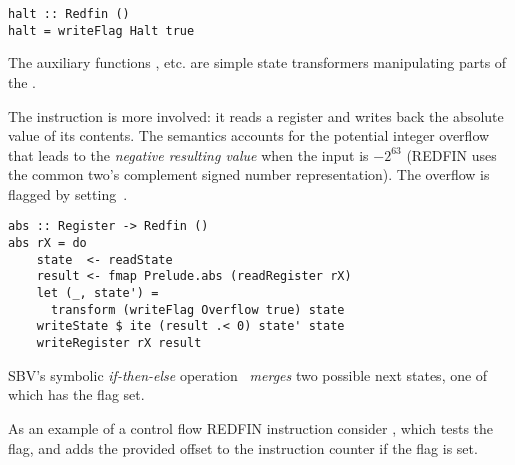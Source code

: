 \begin{verbatim}
halt :: Redfin ()
halt = writeFlag Halt true
\end{verbatim}

\noindent
The auxiliary functions ,  etc. are simple
state transformers manipulating parts of the .


The instruction  is more involved:
it reads a register and writes back the absolute value of its contents.
The semantics accounts for the potential integer overflow that leads to the
\emph{negative resulting value} when the input is $-2^{63}$ (REDFIN uses the
common two's complement signed number representation). The overflow is flagged
by setting~.

\vspace{-0.5mm}
\begin{verbatim}
abs :: Register -> Redfin ()
abs rX = do
    state  <- readState
    result <- fmap Prelude.abs (readRegister rX)
    let (_, state') =
      transform (writeFlag Overflow true) state
    writeState $ ite (result .< 0) state' state
    writeRegister rX result
\end{verbatim}

\noindent
SBV's symbolic \emph{if-then-else} operation~ \emph{merges} two possible
next states, one of which has the  flag set.


As an example of a control flow REDFIN instruction consider , which
tests the~ flag, and adds the provided offset to the instruction
counter if the flag is set.

